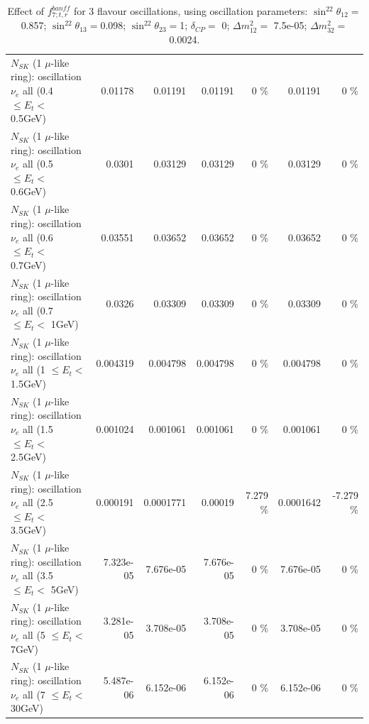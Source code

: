 \begin{table}
\begin{tabular}{| l | r | r | r  r | r  r |}
$N_{SK}$ (1 $\mu$-like ring): oscillation $\nu_{e}$ all (0.4 $\leq E_{t} <$ 0.5GeV) &         0.01178 &         0.01191 &         0.01191 &        0 \%  &         0.01191 &        0 \%  \\ 
$N_{SK}$ (1 $\mu$-like ring): oscillation $\nu_{e}$ all (0.5 $\leq E_{t} <$ 0.6GeV) &          0.0301 &         0.03129 &         0.03129 &        0 \%  &         0.03129 &        0 \%  \\ 
$N_{SK}$ (1 $\mu$-like ring): oscillation $\nu_{e}$ all (0.6 $\leq E_{t} <$ 0.7GeV) &         0.03551 &         0.03652 &         0.03652 &        0 \%  &         0.03652 &        0 \%  \\ 
$N_{SK}$ (1 $\mu$-like ring): oscillation $\nu_{e}$ all (0.7 $\leq E_{t} <$ 1GeV) &          0.0326 &         0.03309 &         0.03309 &        0 \%  &         0.03309 &        0 \%  \\ 
$N_{SK}$ (1 $\mu$-like ring): oscillation $\nu_{e}$ all (1 $\leq E_{t} <$ 1.5GeV) &        0.004319 &        0.004798 &        0.004798 &        0 \%  &        0.004798 &        0 \%  \\ 
$N_{SK}$ (1 $\mu$-like ring): oscillation $\nu_{e}$ all (1.5 $\leq E_{t} <$ 2.5GeV) &        0.001024 &        0.001061 &        0.001061 &        0 \%  &        0.001061 &        0 \%  \\ 
$N_{SK}$ (1 $\mu$-like ring): oscillation $\nu_{e}$ all (2.5 $\leq E_{t} <$ 3.5GeV) &        0.000191 &       0.0001771 &         0.00019 &    7.279 \%  &       0.0001642 &   -7.279 \%  \\ 
$N_{SK}$ (1 $\mu$-like ring): oscillation $\nu_{e}$ all (3.5 $\leq E_{t} <$ 5GeV) &       7.323e-05 &       7.676e-05 &       7.676e-05 &        0 \%  &       7.676e-05 &        0 \%  \\ 
 $N_{SK}$ (1 $\mu$-like ring): oscillation $\nu_{e}$ all (5 $\leq E_{t} <$ 7GeV) &       3.281e-05 &       3.708e-05 &       3.708e-05 &        0 \%  &       3.708e-05 &        0 \%  \\ 
$N_{SK}$ (1 $\mu$-like ring): oscillation $\nu_{e}$ all (7 $\leq E_{t} <$ 30GeV) &       5.487e-06 &       6.152e-06 &       6.152e-06 &        0 \%  &       6.152e-06 &        0 \%  \\ 
\hline
\hline
\end{tabular}
\caption{ Effect of $f_{7; t, r}^{banff}$ for 3 flavour oscillations, using oscillation parameters:  $\sin^22\theta_{12} = $0.857; $\sin^22\theta_{13} = $0.098; $\sin^22\theta_{23} = $1; $\delta_{CP} = $        0; $\Delta m^2_{12} = $    7.5e-05; $\Delta m^2_{32} = $    0.0024. }
\label{tab:num_banff_07_1RmuT_3f_osc_t13:0.098}
\end{table}
